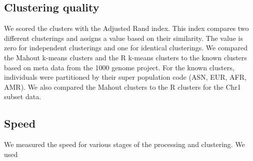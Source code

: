 \documentclass[twocolumn]{bmcart}%
\newcommand{\chrOnePop}{Chr1\_Population}
\begin{document}
\subsection*{Clustering quality}
We scored the clusters with the Adjusted Rand index. 
This index compares two different clusterings and assigns a value based on their similarity. The value is zero for independent clusterings and one for identical clusterings. We compared the Mahout k-means
clusters and the R k-means clusters to the known clusters based on meta data from the 1000 genome project. For the known clusters,
individuals were partitioned by their super population code (ASN, EUR, AFR, AMR). 
We also compared the Mahout clusters to the
R clusters for the Chr1 subset data.



\subsection*{Speed}
We measured the speed for various stages of the processing and clustering. We used 


\end{document}
